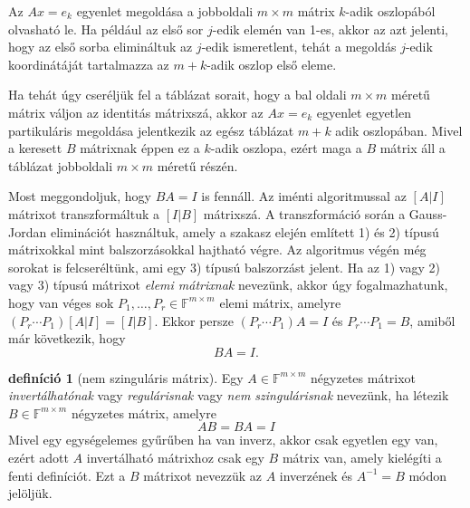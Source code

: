 \documentclass[9pt, showtrims]{memoir}
\theoremstyle{plain}
\theoremstyle{remark}
\theoremstyle{definition}
\newtheorem{definition}[proposition]{definíció}
\renewcommand{\mathbf}{\mathbb}
\begin{document}
Az $Ax=e_k$ egyenlet megoldása a jobboldali $m\times m$ mátrix $k$-adik oszlopából olvasható le. 
Ha például az első sor $j$-edik elemén van 1-es, 
akkor az azt jelenti, hogy az első sorba elimináltuk az $j$-edik ismeretlent, 
tehát a megoldás $j$-edik koordinátáját tartalmazza az $m+k$-adik oszlop első eleme.

Ha tehát úgy cseréljük fel a táblázat sorait, 
hogy a bal oldali $m\times m$ méretű mátrix váljon az identitás mátrixszá, 
akkor az $Ax=e_k$ egyenlet egyetlen partikuláris megoldása jelentkezik az egész táblázat
$m+k$ adik oszlopában.
Mivel a keresett $B$ mátrixnak éppen ez a $k$-adik oszlopa,
ezért maga a $B$ mátrix áll a táblázat jobboldali $m\times m$ méretű részén.

Most meggondoljuk, hogy $BA=I$ is fennáll.
Az iménti algoritmussal az $[A|I]$ mátrixot transzformáltuk a $[I|B]$ mátrixszá.
A transzformáció során a Gauss-Jordan eliminációt használtuk, amely a szakasz elején említett 1) és 2) típusú mátrixokkal mint balszorzásokkal hajtható végre.
Az algoritmus végén még sorokat is felcseréltünk, ami egy 3) típusú balszorzást jelent.
Ha az 1) vagy 2) vagy 3) típusú mátrixot \emph{elemi mátrixnak}
nevezünk, 
akkor úgy fogalmazhatunk, 
hogy van véges sok $P_1,\dots,P_r\in\mathbf{F}^{m\times m}$ elemi mátrix, amelyre
\(
(P_r\cdots P_1)\left[ A|I \right]=\left[ I|B \right].
\)
Ekkor persze $(P_r\cdots P_1)A=I$ és $P_r\cdots P_1=B$,
amiből már következik, hogy
\[
    BA=I.
\]

\begin{definition}[nem szinguláris mátrix]
    Egy $A\in\mathbf{F}^{m\times m}$ négyzetes mátrixot 
    \emph{invertálhatónak} vagy 
    \emph{regulárisnak} vagy \emph{nem szingulárisnak} nevezünk,
    ha létezik $B\in\mathbf{F}^{m\times m}$ négyzetes mátrix, 
    amelyre
    \[
        AB=BA=I
    \]
    Mivel egy egységelemes gyűrűben ha van inverz, akkor csak egyetlen egy van,
    ezért adott $A$ invertálható mátrixhoz csak egy $B$ mátrix van, amely kielégíti a fenti definíciót.
    Ezt a $B$ mátrixot nevezzük az $A$ inverzének és $A^{-1}=B$ módon jelöljük.
\end{definition}
\end{document}
